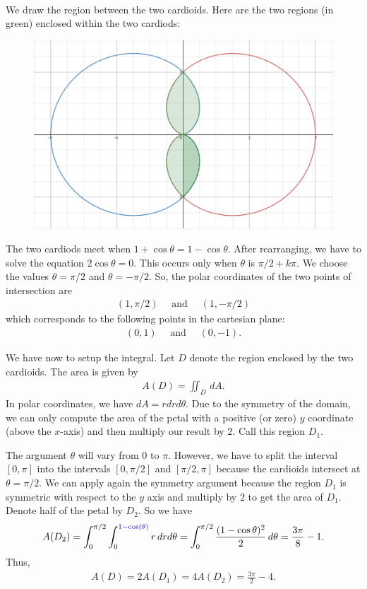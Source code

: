 	\\
	We draw the region between the two cardioids. Here are the two regions (in green) enclosed within the two cardiods:
		\begin{figure}[h]
		\centering
		\includegraphics[scale=0.3]{exo-16_15-3.png}
		\end{figure}
	The two cardiods meet when $1 + \cos \theta = 1 - \cos \theta$. After rearranging, we have to solve the equation $2 \cos \theta = 0$. This occurs only when $\theta$ is $\pi/2 + k \pi$. We choose the values $\theta = \pi/2$ and $\theta = -\pi/2$. So, the polar coordinates of the two points of intersection are
		\begin{align*}
		(1, \pi/2 ) \quad \text{ and } \quad (1, -\pi/2)
		\end{align*}
	which corresponds to the following points in the cartesian plane:
		\begin{align*}
		(0, 1) \quad \text{ and } \quad (0, -1 ). 
		\end{align*} 
		
	We have now to setup the integral. Let $D$ denote the region enclosed by the two cardioids. The area is given by
		\begin{align*}
		A (D) = \iint_D \, dA .
		\end{align*}
	In polar coordinates, we have $dA = r dr d\theta$. Due to the symmetry of the domain, we can only compute the area of the petal with a positive (or zero) $y$ coordinate (above the $x$-axis) and then multiply our result by $2$. Call this region $D_1$. 
	
	The argument $\theta$ will vary from $0$ to $\pi$. However, we have to split the interval $[0, \pi]$ into the intervals $[0, \pi/2]$ and $[\pi/2, \pi ]$ because the cardioids intersect at $\theta = \pi/2$. We can apply again the symmetry argument because the region $D_1$ is symmetric with respect to the $y$ axis and multiply by $2$ to get the area of $D_1$. Denote half of the petal by $D_2$. So we have
		\begin{align*}
		A(D_2) = \int_0^{\pi/2} \int_0^{\textcolor{blue}{1 - \cos (\theta )}} r \, dr d\theta = \int_0^{\pi/2} \frac{(1 - \cos \theta )^2}{2} \, d\theta = \frac{3 \pi}{8} - 1 .
		\end{align*}
	Thus, 
		\begin{align*}
		A (D) = 2 A(D_1) = 4 A(D_2) = \frac{3\pi}{2} - 4 .
		\end{align*}

